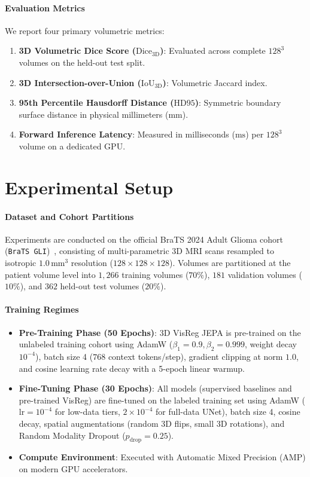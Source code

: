 \documentclass{article}
\begin{document}
\paragraph{Evaluation Metrics}
We report four primary volumetric metrics:
\begin{enumerate}
    \item \textbf{3D Volumetric Dice Score ($\text{Dice}_{3\text{D}}$)}: Evaluated across complete $128^3$ volumes on the held-out test split.
    \item \textbf{3D Intersection-over-Union ($\text{IoU}_{3\text{D}}$)}: Volumetric Jaccard index.
    \item \textbf{95th Percentile Hausdorff Distance ($\text{HD95}$)}: Symmetric boundary surface distance in physical millimeters ($\text{mm}$).
    \item \textbf{Forward Inference Latency}: Measured in milliseconds ($\text{ms}$) per $128^3$ volume on a dedicated GPU.
\end{enumerate}


\section{Experimental Setup}
\label{sec:experimental_setup}

\paragraph{Dataset and Cohort Partitions}
Experiments are conducted on the official BraTS 2024 Adult Glioma cohort (\texttt{BraTS GLI})~\citep{brats2024}, consisting of multi-parametric 3D MRI scans resampled to isotropic $1.0\,\text{mm}^3$ resolution ($128 \times 128 \times 128$). Volumes are partitioned at the patient volume level into $1,266$ training volumes ($70\%$), $181$ validation volumes ($10\%$), and $362$ held-out test volumes ($20\%$).

\paragraph{Training Regimes}
\begin{itemize}
    \item \textbf{Pre-Training Phase (50 Epochs)}: 3D VisReg JEPA is pre-trained on the unlabeled training cohort using AdamW ($\beta_1=0.9, \beta_2=0.999$, weight decay $10^{-4}$), batch size 4 ($768$ context tokens/step), gradient clipping at norm $1.0$, and cosine learning rate decay with a 5-epoch linear warmup.
    \item \textbf{Fine-Tuning Phase (30 Epochs)}: All models (supervised baselines and pre-trained VisReg) are fine-tuned on the labeled training set using AdamW ($\text{lr} = 10^{-4}$ for low-data tiers, $2 \times 10^{-4}$ for full-data UNet), batch size 4, cosine decay, spatial augmentations (random 3D flips, small 3D rotations), and Random Modality Dropout ($p_{\text{drop}} = 0.25$).
    \item \textbf{Compute Environment}: Executed with Automatic Mixed Precision (AMP) on modern GPU accelerators.
\end{itemize}
\end{document}
